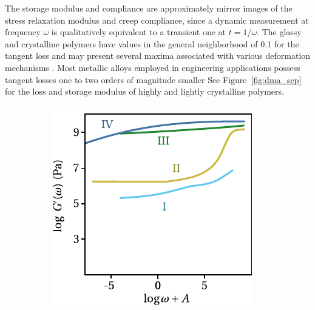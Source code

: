 The storage modulus and compliance are approximately mirror images of the stress relaxation modulus and creep compliance, since a dynamic measurement at frequency $\omega$ is qualitatively equivalent to a transient one at $t=1/\omega$.
The glassy and crystalline polymers have values in the general neighborhood of 0.1 for the tangent loss and may present several maxima associated with various deformation mechanisms \citep{ferryViscoelasticPropertiesPolymers1980}.
Most metallic alloys employed in engineering applications possess tangent losses one to two orders of magnitude smaller \citep{ashbyMaterialsSelectionMechanical1999}
See Figure~\ref{fig:dma_scp} for the loss and storage modulus of highly and lightly crystalline polymers.
\begin{figure}[hbtp]
\centering
\begin{subfigure}[b]{0.45\textwidth}
\centering
\includegraphics[width=\textwidth]{figures/storage_modulus_scp}
\caption{}
\label{subfig:storage_modulus_scp}
\end{subfigure} \hfill
    \begin{subfigure}[b]{0.45\textwidth}
        \centering

\end{subfigure}
\end{figure}
